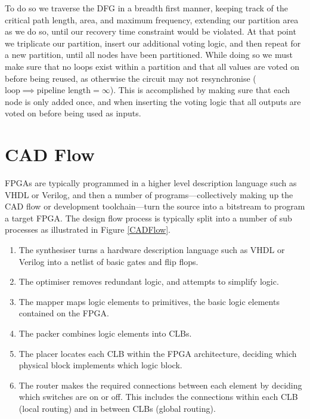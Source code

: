 \documentclass[12pt,drafta4paper,oneside]{memoir} %
\begin{document}
To do so we traverse the \ac{DFG} in a breadth first manner, keeping track of the critical path length, area, and maximum frequency, extending our partition area as we do so, until our recovery time constraint would be violated. At that point we triplicate our partition, insert our additional voting logic, and then repeat for a new partition, until all nodes have been partitioned.  While doing so we must make sure that no loops exist within a partition and that all values are voted on before being reused, as otherwise the circuit may not resynchronise ($\mbox{loop} \implies \mbox{pipeline length} = \infty$). This is accomplished by making sure that each node is only added once, and when inserting the voting logic that all outputs are voted on before being used as inputs.

\section{\acs{CAD} Flow}
\acp{FPGA} are typically programmed in a higher level description language such as VHDL or Verilog, and then a number of programs---collectively making up the \ac{CAD} flow or development toolchain---turn the source into a bitstream to program a target \ac{FPGA}.
The design flow process is typically split into a number of sub processes as illustrated in Figure \ref{CADFlow}\cite{VPRBook,VPRManual,FPGAArch}.
\begin{enumerate}
    \item The synthesiser turns a hardware description language such as VHDL or Verilog into a netlist of basic gates and flip flops.
    \item The optimiser removes redundant logic, and attempts to simplify logic.
    \item The mapper maps logic elements to primitives, the basic logic elements contained on the \ac{FPGA}.
    \item The packer combines logic elements into \acp{CLB}.
    \item The placer locates each \ac{CLB} within the \ac{FPGA} architecture, deciding which physical block implements which logic block.
    \item The router makes the required connections between each element by deciding which switches are on or off. This includes the connections within each \ac{CLB} (local routing) and in between \acp{CLB} (global routing).
\end{enumerate}
\end{document}
